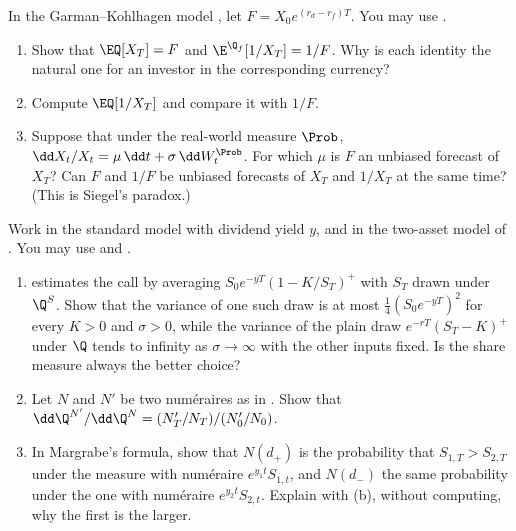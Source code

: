 \providecommand{\Black}{\operatorname{Black}}
\providecommand{\Corr}{\operatorname{Corr}}

\begin{exercise}\label{ex:ma-siegel}
\easy In the Garman--Kohlhagen model , let $F=X_0e^{(r_d-r_f)T}$. You may use
.
\begin{enumerate}[label=(\alph*)]
  \item Show that $\EQ[X_T]=F$ and $\E^{\Q_f}[1/X_T]=1/F$. Why is each identity the natural one for
    an investor in the corresponding currency?
  \item Compute $\EQ[1/X_T]$ and compare it with $1/F$.
  \item Suppose that under the real-world measure $\Prob$, $\dd X_t/X_t=\mu\,\dd t+\sigma\,\dd W^{\Prob}_t$.
    For which $\mu$ is $F$ an unbiased forecast of $X_T$? Can $F$ and $1/F$ be unbiased forecasts of
    $X_T$ and $1/X_T$ at the same time? (This is Siegel's paradox.)
\end{enumerate}
\end{exercise}

\begin{exercise}\label{ex:ma-share}
\easy Work in the standard model with dividend yield $y$, and in the two-asset model of
. You may use  and .
\begin{enumerate}[label=(\alph*)]
  \item {} estimates the call by averaging $S_0e^{-yT}(1-K/S_T)^+$ with $S_T$
    drawn under $\Q^S$. Show that the variance of one such draw is at most $\frac14(S_0e^{-yT})^2$ for every
    $K>0$ and $\sigma>0$, while the variance of the plain draw $e^{-rT}(S_T-K)^+$ under $\Q$ tends to infinity as
    $\sigma\to\infty$ with the other inputs fixed. Is the share measure always the better choice?
  \item Let $N$ and $N'$ be two num\'eraires as in . Show that
    $\dd\Q^{N'}/\dd\Q^N=(N'_T/N_T)/(N'_0/N_0)$.
  \item In Margrabe's formula, show that $N(d_+)$ is the probability that $S_{1,T}>S_{2,T}$ under the
    measure with num\'eraire $e^{y_1t}S_{1,t}$, and $N(d_-)$ the same probability under the one with
    num\'eraire $e^{y_2t}S_{2,t}$. Explain with (b), without computing, why the first is the larger.
\end{enumerate}
\end{exercise}

